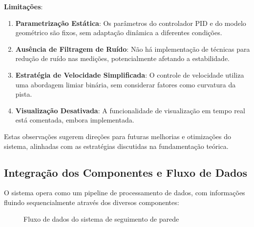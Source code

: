 \textbf{Limitações}:

\begin{enumerate}
    \item \textbf{Parametrização Estática}: Os parâmetros do controlador PID e do modelo geométrico são fixos, sem adaptação dinâmica a diferentes condições.

    \item \textbf{Ausência de Filtragem de Ruído}: Não há implementação de técnicas para redução de ruído nas medições, potencialmente afetando a estabilidade.

    \item \textbf{Estratégia de Velocidade Simplificada}: O controle de velocidade utiliza uma abordagem limiar binária, sem considerar fatores como curvatura da pista.

    \item \textbf{Visualização Desativada}: A funcionalidade de visualização em tempo real está comentada, embora implementada.
\end{enumerate}

Estas observações sugerem direções para futuras melhorias e otimizações do
sistema, alinhadas com as estratégias discutidas na fundamentação teórica.

\subsection{Integração dos Componentes e Fluxo de Dados}

O sistema opera como um pipeline de processamento de dados, com informações
fluindo sequencialmente através dos diversos componentes:

\begin{figure}[ht]
    \centering
    \caption{Fluxo de dados do sistema de seguimento de parede}
    \label{fig:wall_follow_flow}
\end{figure}

